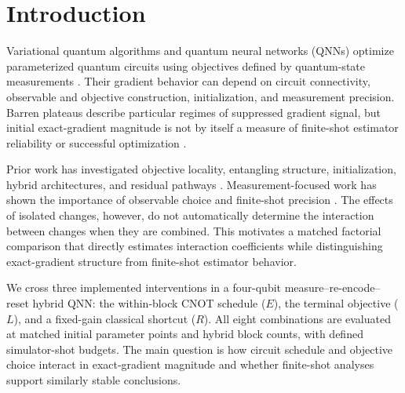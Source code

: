 \documentclass[pdflatex,sn-mathphys-num,Numbered]{sn-jnl}
\begin{document}
\section{Introduction}\label{sec:introduction}

Variational quantum algorithms and quantum neural networks (QNNs) optimize parameterized quantum circuits using objectives defined by quantum-state measurements \cite{cerezo2021vqa,mitarai2018quantum,schuld2019evaluating}. Their gradient behavior can depend on circuit connectivity, observable and objective construction, initialization, and measurement precision. Barren plateaus describe particular regimes of suppressed gradient signal, but initial exact-gradient magnitude is not by itself a measure of finite-shot estimator reliability or successful optimization \cite{mcclean2018barren,anschuetz2022traps,thanasilp2023subtleties,larocca2025barren}.

Prior work has investigated objective locality, entangling structure, initialization, hybrid architectures, and residual pathways \cite{cerezo2021costfunction,ortizmarrero2021entanglement,patti2021entanglement,grant2019identity,skolik2021layerwise,beer2020training,kashif2024resqnets}. Measurement-focused work has shown the importance of observable choice and finite-shot precision \cite{kubler2020adaptive,tamiya2022stochastic,kreplin2024finite,chinzei2025tradeoff,bowles2025backpropagation}. The effects of isolated changes, however, do not automatically determine the interaction between changes when they are combined. This motivates a matched factorial comparison that directly estimates interaction coefficients while distinguishing exact-gradient structure from finite-shot estimator behavior.

We cross three implemented interventions in a four-qubit measure--re-encode--reset hybrid QNN: the within-block CNOT schedule ($E$), the terminal objective ($L$), and a fixed-gain classical shortcut ($R$). All eight combinations are evaluated at matched initial parameter points and hybrid block counts, with defined simulator-shot budgets. The main question is how circuit schedule and objective choice interact in exact-gradient magnitude and whether finite-shot analyses support similarly stable conclusions.
\end{document}
